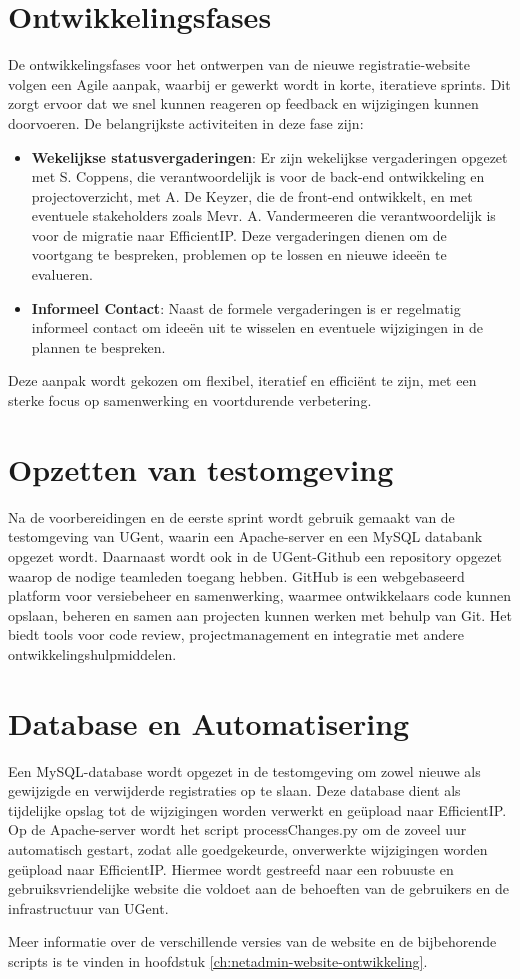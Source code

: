 \section{Ontwikkelingsfases}
\label{agile}
De ontwikkelingsfases voor het ontwerpen van de nieuwe registratie-website volgen een Agile aanpak, waarbij er gewerkt wordt in korte, iteratieve sprints. Dit zorgt ervoor dat we snel kunnen reageren op feedback en wijzigingen kunnen doorvoeren. De belangrijkste activiteiten in deze fase zijn:
\begin{itemize}
    \item \textbf{Wekelijkse statusvergaderingen}: Er zijn wekelijkse vergaderingen opgezet met S. Coppens, die verantwoordelijk is voor de back-end ontwikkeling en \\projectoverzicht, met A. De Keyzer, die de front-end ontwikkelt, en met eventuele stakeholders zoals Mevr. A. Vandermeeren die verantwoordelijk is voor de migratie naar EfficientIP. Deze vergaderingen dienen om de voortgang te bespreken, problemen op te lossen en nieuwe ideeën te evalueren.
    \item \textbf{Informeel Contact}: Naast de formele vergaderingen is er regelmatig informeel contact om ideeën uit te wisselen en eventuele wijzigingen in de plannen te bespreken.
\end{itemize}
Deze aanpak wordt gekozen om flexibel, iteratief en efficiënt te zijn, met een sterke focus op samenwerking en voortdurende verbetering. 

\section{Opzetten van testomgeving}
Na de voorbereidingen en de eerste sprint wordt gebruik gemaakt van de testomgeving van UGent, waarin een Apache-server en een MySQL databank opgezet wordt. 
Daarnaast wordt ook in de UGent-Github een repository opgezet waarop de nodige teamleden toegang hebben. GitHub is een webgebaseerd platform voor versiebeheer en samenwerking, waarmee ontwikkelaars code kunnen opslaan, beheren en samen aan projecten kunnen werken met behulp van Git. Het biedt tools voor code review, projectmanagement en integratie met andere ontwikkelingshulpmiddelen.

\section{Database en Automatisering}
Een MySQL-database wordt opgezet in de testomgeving om zowel nieuwe als gewijzigde en verwijderde registraties op te slaan. Deze database dient als tijdelijke opslag tot de wijzigingen worden verwerkt en geüpload naar EfficientIP. Op de Apache-server wordt het script processChanges.py om de zoveel uur automatisch gestart, zodat alle goedgekeurde, onverwerkte wijzigingen worden geüpload naar EfficientIP. Hiermee wordt gestreefd naar een robuuste en gebruiksvriendelijke website die voldoet aan de behoeften van de gebruikers en de infrastructuur van UGent.

Meer informatie over de verschillende versies van de website en de bijbehorende scripts is te vinden in hoofdstuk \ref{ch:netadmin-website-ontwikkeling}.

